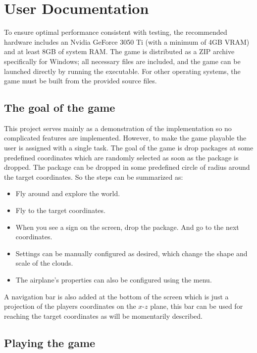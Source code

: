 \chapter{User Documentation}
\label{ch:user}

To ensure optimal performance consistent with testing, the recommended hardware includes an Nvidia GeForce 3050 Ti (with a minimum of 4GB VRAM) and at least 8GB of system RAM. The game is distributed as a ZIP archive specifically for Windows; all necessary files are included, and the game can be launched directly by running the executable. For other operating systems, the game must be built from the provided source files.


\section{The goal of the game}

This project serves mainly as a demonstration of the implementation so no complicated features are implemented. However, to make the game playable the user is assigned with a single task. The goal of the game is drop packages at some predefined coordinates which are randomly selected as soon as the package is dropped. The package can be dropped in some predefined circle of radius around the target coordinates. So the steps can be summarized as: 

\begin{itemize}
	\item Fly around and explore the world.
	\item Fly to the target coordinates.
	\item When you see a sign on the screen, drop the package. And go to the next coordinates.
	\item Settings can be manually configured as desired, which change the shape and scale of the clouds.
	\item The airplane's properties can also be configured using the menu.
\end{itemize}

A navigation bar is also added at the bottom of the screen which is just a projection of the players coordinates on the $x$-$z$ plane, this bar can be used for reaching the target coordinates as will be momentarily described.

\section{Playing the game}


